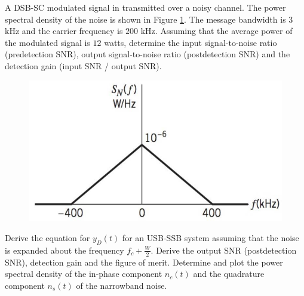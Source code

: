 \documentclass{assignment}
\begin{document}
\begin{prob}
    A DSB-SC modulated signal in transmitted over a noisy channel. The power spectral density of the noise is shown in Figure \ref{A-6-P-1}. The message bandwidth is $3$ kHz and the carrier frequency is $200$ kHz. Assuming that the average power of the modulated signal is $12$ watts, determine the input signal-to-noise ratio (predetection SNR), output signal-to-noise ratio (postdetection SNR) and the detection gain (input SNR / output SNR).
    \begin{figure}[h]
        \centering
        \includegraphics[width=.5\columnwidth]{A-6-P-1.jpg}
        \caption{}
        \label{A-6-P-1}
    \end{figure}
\end{prob}
\begin{sol}

\end{sol}

\begin{prob}
    Derive the equation for $y_D(t)$ for an USB-SSB system assuming that the noise is expanded about the frequency $f_c+\frac{W}{2}$. Derive the output SNR (postdetection SNR), detection gain and the figure of merit. Determine and plot the power spectral density of the in-phase component $n_c(t)$ and the quadrature component $n_s(t)$ of the narrowband noise.
\end{prob}
\begin{sol}
    
\end{sol}
\end{document}
